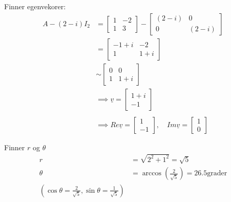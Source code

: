 \documentclass[11pt, a4paper, norsk]{article}
\begin{document}
\begin{Example}{}{}
            Finner egenvekorer:
            \begin{align*}
                A - (2-i)I_{2} &= \begin{bmatrix}
                    1 & -2 \\
                    1 & 3
                \end{bmatrix} - \begin{bmatrix}
                    (2-i) & 0 \\
                    0 & (2-i)
                \end{bmatrix} \\
                               &= \begin{bmatrix}
                                   -1 + i & -2 \\
                                   1 & 1 + i
                               \end{bmatrix}
                               \\
                               &\sim \begin{bmatrix}
                                   0 & 0 \\
                                   1 & 1+i
                               \end{bmatrix}
                               \\
                               &\implies \underline{v} = \begin{bmatrix}
                                   1 + i \\
                                   -1
                               \end{bmatrix}
                               \\
                               \\
                               &\implies Re\underline{v} = \begin{bmatrix}
                                   1 \\
                                   -1
                               \end{bmatrix}, \quad Im\underline{v} = \begin{bmatrix}
                                   1 \\
                                   0
                               \end{bmatrix}
            \end{align*}

            Finner $r$ og $\theta$
            \begin{align*}
                r &= \sqrt{2^2 + 1^2} = \sqrt{5}
                \\
                \theta &= \arccos\left(\frac{2}{\sqrt{5}}\right) = 26.5\text{grader}
                \\
                (\cos{\theta} = \frac{2}{\sqrt{5}}, \sin{\theta} = \frac{1}{\sqrt{5}})
            \end{align*}
            

\end{Example}
\end{document}
